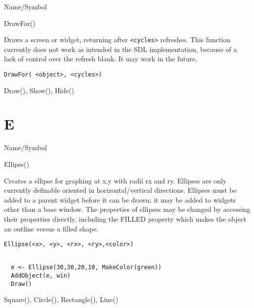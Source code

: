 \rl



\begin{desc}{Name/Symbol}
\item[Name/Symbol]	DrawFor()

\item[Description]  	Draws a screen or widget, returning after \verb+<cycles>+ refreshes. This function currently does not work as intended in the SDL implementation, because of a lack of control over the
		refresh blank.  It may work in the future.

\item[Usage]
\begin{verbatim}
DrawFor( <object>, <cycles>)
\end{verbatim}

\item[Example]	

\item[See Also]	Draw(), Show(), Hide()
\end{desc}

\rl
\section{E}
\rl




\begin{desc}{Name/Symbol}
\item[Name/Symbol]	Ellipse()
  
\item[Description]	Creates a ellipse for graphing at x,y with radii
  rx and ry. Ellipses are only currently definable oriented in
  horizontal/vertical directions.  Ellipses  must be added
  to a parent widget before it can be drawn; it may be added to
  widgets other than a base window.  The properties of ellipses may be
  changed by accessing their properties directly, including the FILLED
  property which makes the object an outline versus a filled shape.

\item[Usage]
\begin{verbatim}
Ellipse(<x>, <y>, <rx>, <ry>,<color>)
\end{verbatim}

\item[Example]	
\begin{verbatim}
  
  e <- Ellipse(30,30,20,10, MakeColor(green))
  AddObject(e, win)
  Draw()

\end{verbatim}
\item[See Also]	Square(), Circle(), Rectangle(), Line()
\end{desc}

